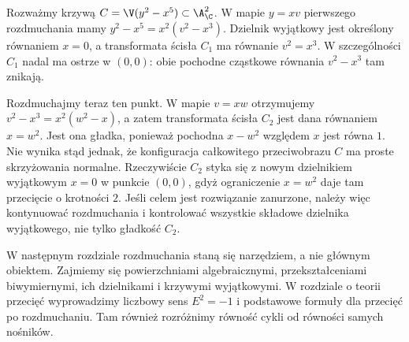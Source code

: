 \begin{przyklad}[Dwa kolejne rozdmuchania ostrza $y^2=x^5$]
Rozważmy krzywą $C=\V(y^2-x^5)\subset\A^2_{\C}$.
W mapie $y=xv$ pierwszego rozdmuchania mamy
$y^2-x^5=x^2(v^2-x^3)$. Dzielnik wyjątkowy jest
określony równaniem $x=0$, a transformata ścisła
$C_1$ ma równanie $v^2=x^3$. W szczególności
$C_1$ nadal ma ostrze w $(0,0)$: obie pochodne
cząstkowe równania $v^2-x^3$ tam znikają.

Rozdmuchajmy teraz ten punkt. W mapie $v=xw$
otrzymujemy $v^2-x^3=x^2(w^2-x)$, a zatem
transformata ścisła $C_2$ jest dana równaniem
$x=w^2$. Jest ona gładka, ponieważ pochodna
$x-w^2$ względem $x$ jest równa $1$.
Nie wynika stąd jednak, że konfiguracja całkowitego
przeciwobrazu $C$ ma proste skrzyżowania normalne.
Rzeczywiście $C_2$ styka się z nowym dzielnikiem
wyjątkowym $x=0$ w punkcie $(0,0)$, gdyż ograniczenie
$x=w^2$ daje tam przecięcie o krotności $2$.
Jeśli celem jest rozwiązanie zanurzone, należy więc
kontynuować rozdmuchania i kontrolować wszystkie
składowe dzielnika wyjątkowego, nie tylko gładkość $C_2$.
\end{przyklad}

\begin{uwaga}
W następnym rozdziale rozdmuchania staną się
narzędziem, a nie głównym obiektem. Zajmiemy się
powierzchniami algebraicznymi, przekształceniami
biwymiernymi, ich dzielnikami i krzywymi wyjątkowymi.
W rozdziale o teorii przecięć wyprowadzimy
liczbowy sens $E^2=-1$ i podstawowe formuły
dla przecięć po rozdmuchaniu. Tam również rozróżnimy
równość cykli od równości samych nośników.
\end{uwaga}



